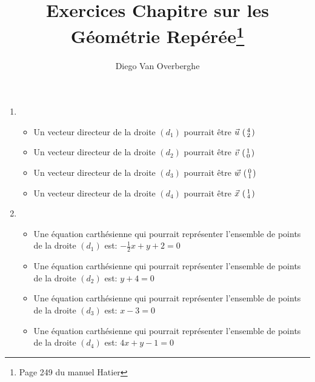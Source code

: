 \documentclass[12pt, a4paper]{article}
\begin{document}
    \title{Exercices Chapitre sur les Géométrie Repérée\footnote{Page 249 du manuel Hatier}}
    \author{Diego Van Overberghe}
    \maketitle

    \begin{Exercise}[number={5}]
        \begin{enumerate}[1)]
           \item 	\begin{itemize}
                        \item 	Un vecteur directeur de la droite $(d_1)$ pourrait être $\vec{u}\ \begin{psmallmatrix}4 \\ 2\end{psmallmatrix}$
                        \item 	Un vecteur directeur de la droite $(d_2)$ pourrait être $\vec{v}\ \begin{psmallmatrix}1 \\ 0\end{psmallmatrix}$
                        \item	Un vecteur directeur de la droite $(d_3)$ pourrait être $\vec{w}\ \begin{psmallmatrix}0 \\ 1\end{psmallmatrix}$
                        \item	Un vecteur directeur de la droite $(d_4)$ pourrait être $\vec{x}\ \begin{psmallmatrix}1 \\ 4\end{psmallmatrix}$
                    \end{itemize}
            \item	\begin{itemize}
                        \item 	Une équation carthésienne qui pourrait représenter l'ensemble de points de la droite $(d_1)$ est: $-\frac{1}{2}x+y+2=0$
                        \item 	Une équation carthésienne qui pourrait représenter l'ensemble de points de la droite $(d_2)$ est: $y+4=0$
                        \item 	Une équation carthésienne qui pourrait représenter l'ensemble de points de la droite $(d_3)$ est: $x-3=0$
                        \item 	Une équation carthésienne qui pourrait représenter l'ensemble de points de la droite $(d_4)$ est: $4x+y-1=0$
                    \end{itemize}
        \end{enumerate}
    \end{Exercise}
    
\end{document}
